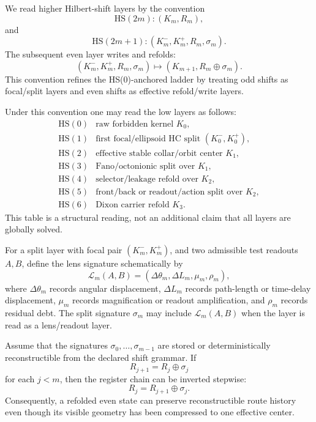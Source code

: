 \begin{definition}
\label{def:higher-hs-alternation-convention}
We read higher Hilbert-shift layers by the convention
\[
  \mathrm{HS}(2m): (K_m,R_m),
\]
and
\[
  \mathrm{HS}(2m+1): (K_m^-,K_m^+,R_m,\sigma_m).
\]
The subsequent even layer writes and refolds:
\[
  (K_m^-,K_m^+,R_m,\sigma_m)
  \longmapsto
  (K_{m+1},R_m\oplus\sigma_m).
\]
This convention refines the HS(0)-anchored ladder by treating odd shifts
as focal/split layers and even shifts as effective refold/write layers.
\end{definition}

\begin{remark}
\label{rem:low-hs-layers-split-refold-reading}
Under this convention one may read the low layers as follows:
\[
\begin{array}{c|l}
\mathrm{HS}(0) & \text{raw forbidden kernel }K_0,\\
\mathrm{HS}(1) & \text{first focal/ellipsoid HC split }(K_0^-,K_0^+),\\
\mathrm{HS}(2) & \text{effective stable collar/orbit center }K_1,\\
\mathrm{HS}(3) & \text{Fano/octonionic split over }K_1,\\
\mathrm{HS}(4) & \text{selector/leakage refold over }K_2,\\
\mathrm{HS}(5) & \text{front/back or readout/action split over }K_2,\\
\mathrm{HS}(6) & \text{Dixon carrier refold }K_3.
\end{array}
\]
This table is a structural reading, not an additional claim that all layers
are globally solved.
\end{remark}

\begin{definition}
\label{def:lens-signature-of-split}
For a split layer with focal pair \((K_m^-,K_m^+)\), and two admissible
test readouts \(A,B\), define the lens signature schematically by
\[
  \mathcal L_m(A,B)
  =
  (\Delta\theta_m,\Delta L_m,\mu_m,\rho_m),
\]
where \(\Delta\theta_m\) records angular displacement, \(\Delta L_m\)
records path-length or time-delay displacement, \(\mu_m\) records
magnification or readout amplification, and \(\rho_m\) records residual
debt.  The split signature \(\sigma_m\) may include \(\mathcal L_m(A,B)\)
when the layer is read as a lens/readout layer.
\end{definition}

\begin{lemma}
\label{lem:xor-reconstruction-known-signatures}
Assume that the signatures \(\sigma_0,\ldots,\sigma_{m-1}\) are stored or
deterministically reconstructible from the declared shift grammar.  If
\[
  R_{j+1}=R_j\oplus\sigma_j
\]
for each \(j<m\), then the register chain can be inverted stepwise:
\[
  R_j=R_{j+1}\oplus\sigma_j.
\]
Consequently, a refolded even state can preserve reconstructible route
history even though its visible geometry has been compressed to one
effective center.
\end{lemma}

